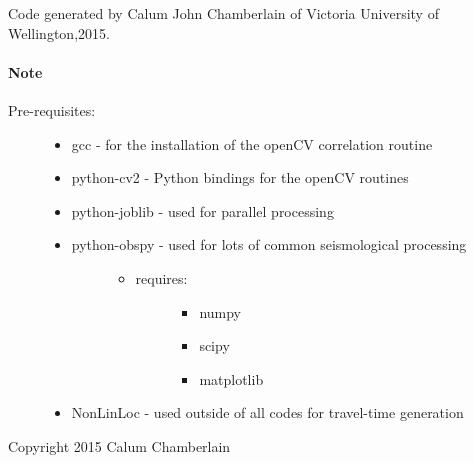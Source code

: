 \documentclass[a4paper,10pt,english]{sphinxmanual}
\begin{document}
Code generated by Calum John Chamberlain of Victoria University of Wellington,2015.
\paragraph{Note}
\begin{description}
\item[{Pre-requisites:}] \leavevmode\begin{itemize}
\item {} 
gcc             - for the installation of the openCV correlation routine

\item {} 
python-cv2      - Python bindings for the openCV routines

\item {} 
python-joblib   - used for parallel processing

\item {} \begin{description}
\item[{python-obspy    - used for lots of common seismological processing}] \leavevmode\begin{itemize}
\item {} \begin{description}
\item[{requires:}] \leavevmode\begin{itemize}
\item {} 
numpy

\item {} 
scipy

\item {} 
matplotlib

\end{itemize}

\end{description}

\end{itemize}

\end{description}

\item {} 
NonLinLoc       - used outside of all codes for travel-time generation

\end{itemize}

\end{description}

Copyright 2015 Calum Chamberlain
\end{document}
